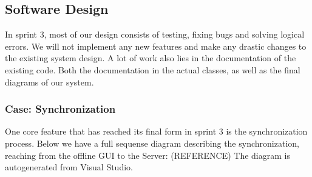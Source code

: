 \subsection{Software Design}
In sprint 3, most of our design consists of testing, fixing bugs and solving logical errors. We will not implement any new features and make any drastic changes to the existing system design. A lot of work also lies in the documentation of the existing code. Both the documentation in the actual classes, as well as the final diagrams of our system. 
\subsubsection{Case: Synchronization}
One core feature that has reached its final form in sprint 3 is the synchronization process. Below we have a full sequense diagram describing the synchronization, reaching from the offline GUI to the Server:
(REFERENCE)
The diagram is autogenerated from Visual Studio. 

